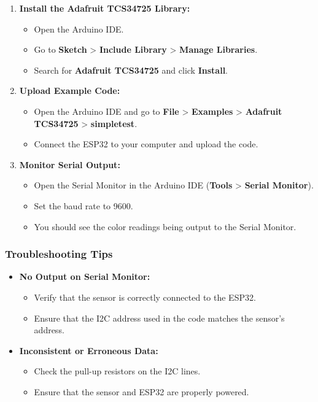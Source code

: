 \begin{enumerate}[label=\arabic*.]
	\item \textbf{Install the Adafruit TCS34725 Library:}
	\begin{itemize}
		\item Open the Arduino IDE.
		\item Go to \textbf{Sketch} > \textbf{Include Library} > \textbf{Manage Libraries}.
		\item Search for \textbf{Adafruit TCS34725} and click \textbf{Install}.
	\end{itemize}
	
	\item \textbf{Upload Example Code:}
	\begin{itemize}
		\item Open the Arduino IDE and go to \textbf{File} > \textbf{Examples} > \textbf{Adafruit TCS34725} > \textbf{simpletest}.
		\item Connect the ESP32 to your computer and upload the code.
	\end{itemize}
	
	\item \textbf{Monitor Serial Output:}
	\begin{itemize}
		\item Open the Serial Monitor in the Arduino IDE (\textbf{Tools} > \textbf{Serial Monitor}).
		\item Set the baud rate to 9600.
		\item You should see the color readings being output to the Serial Monitor.
	\end{itemize}
\end{enumerate}

\subsubsection*{Troubleshooting Tips}
\begin{itemize}
	\item \textbf{No Output on Serial Monitor:}
	\begin{itemize}
		\item Verify that the sensor is correctly connected to the ESP32.
		\item Ensure that the I2C address used in the code matches the sensor’s address.
	\end{itemize}
	
	\item \textbf{Inconsistent or Erroneous Data:}
	\begin{itemize}
		\item Check the pull-up resistors on the I2C lines.
		\item Ensure that the sensor and ESP32 are properly powered.
	\end{itemize}
\end{itemize}


